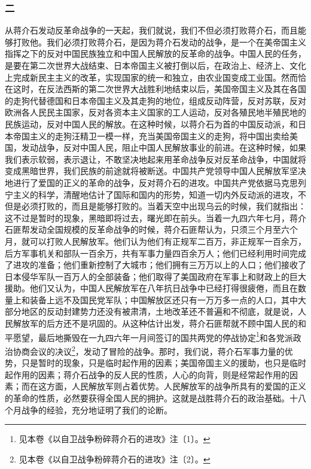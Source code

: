 \documentclass[cn,11pt,chinese]{elegantbook}
\def\myformat#1{\hfil\hfil #1}
\begin{document}
\subsubsection*{\myformat{二}}
从蒋介石发动反革命战争的一天起，我们就说，我们不但必须打败蒋介石，而且能够打败他。我们必须打败蒋介石，是因为蒋介石发动的战争，是一个在美帝国主义指挥之下的反对中国民族独立和中国人民解放的反革命的战争。中国人民的任务，是要在第二次世界大战结束、日本帝国主义被打倒以后，在政治上、经济上、文化上完成新民主主义的改革，实现国家的统一和独立，由农业国变成工业国。然而恰在这时，在反法西斯的第二次世界大战胜利地结束以后，美国帝国主义及其在各国的走狗代替德国和日本帝国主义及其走狗的地位，组成反动阵营，反对苏联，反对欧洲各人民民主国家，反对各资本主义国家的工人运动，反对各殖民地半殖民地的民族运动，反对中国人民的解放。在这种时候，以蒋介石为首的中国反动派，和日本帝国主义的走狗汪精卫一模一样，充当美国帝国主义的走狗，将中国出卖给美国，发动战争，反对中国人民，阻止中国人民解放事业的前进。在这种时候，如果我们表示软弱，表示退让，不敢坚决地起来用革命战争反对反革命战争，中国就将变成黑暗世界，我们民族的前途就将被断送。中国共产党领导中国人民解放军坚决地进行了爱国的正义的革命的战争，反对蒋介石的进攻。中国共产党依据马克思列宁主义的科学，清醒地估计了国际和国内的形势，知道一切内外反动派的进攻，不但是必须打败的，而且是能够打败的。当着天空中出现乌云的时候，我们就指出：这不过是暂时的现象，黑暗即将过去，曙光即在前头。当着一九四六年七月，蒋介石匪帮发动全国规模的反革命战争的时候，蒋介石匪帮认为，只须三个月至六个月，就可以打败人民解放军。他们认为他们有正规军二百万，非正规军一百余万，后方军事机关和部队一百余万，共有军事力量四百余万人；他们已经利用时间完成了进攻的准备；他们重新控制了大城市；他们拥有三万万以上的人口；他们接收了日本侵华军队一百万人的全部装备；他们取得了美国政府在军事上和财政上的巨大援助。他们又认为，中国人民解放军在八年抗日战争中已经打得很疲倦，而且在数量上和装备上远不及国民党军队；中国解放区还只有一万万多一点的人口，其中大部分地区的反动封建势力还没有被肃清，土地改革还不普遍和不彻底，就是说，人民解放军的后方还不是巩固的。从这种估计出发，蒋介石匪帮就不顾中国人民的和平愿望，最后地撕毁在一九四六年一月间签订的国共两党的停战协定\footnote[2]{ 见本卷《以自卫战争粉碎蒋介石的进攻》注〔1〕。}和各党派政治协商会议的决议\footnote[3]{ 见本卷《以自卫战争粉碎蒋介石的进攻》注〔2〕。}，发动了冒险的战争。那时，我们说，蒋介石军事力量的优势，只是暂时的现象，只是临时起作用的因素；美国帝国主义的援助，也只是临时起作用的因素；蒋介石战争的反人民的性质，人心的向背，则是经常起作用的因素；而在这方面，人民解放军则占着优势。人民解放军的战争所具有的爱国的正义的革命的性质，必然要获得全国人民的拥护。这就是战胜蒋介石的政治基础。十八个月战争的经验，充分地证明了我们的论断。\\
\end{document}
